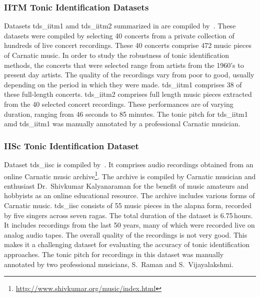 {\subsubsection{IITM Tonic Identification Datasets}
\label{sec:corpus_iitm_tonic_datasets}

Datasets \acrshort{tds_iitm1} amd \acrshort{tds_iitm2} summarized in  are compiled by~\cite{bellur2012knowledge}. These datasets were compiled by selecting 40 concerts from a private collection of hundreds of live concert recordings. These 40 concerts comprise 472 music pieces of Carnatic music. In order to study the robustness of tonic identification methods, the concerts that were selected range from artists from the 1960's to present day artists. The quality of the recordings vary from poor to good, usually depending on the period in which they were made. \acrshort{tds_iitm1} comprises 38 of these full-length concerts. \acrshort{tds_iitm2} comprises full length music pieces extracted from the 40 selected concert recordings. These performances are of varying duration, ranging from 46 seconds to 85 minutes. The tonic pitch for \acrshort{tds_iitm1} amd \acrshort{tds_iitm1} was manually annotated by a professional Carnatic musician.


\subsubsection{IISc Tonic Identification Dataset}
\label{sec:corpus_iisc_tonic_dataset}

Dataset \acrshort{tds_iisc} is compiled by~\cite{ranjani2011carnatic}. It comprises audio recordings obtained from an online Carnatic music archive\footnote{\url{http://www.shivkumar.org/music/index.html}}. The archive is compiled by Carnatic musician and enthusiast Dr.~Shivkumar Kalyanaraman for the benefit of music amateurs and hobbyists as an online educational resource. The archive includes various forms of Carnatic music. \acrshort{tds_iisc} consists of 55 music pieces in the \gls{alapna} form, recorded by five singers across seven \glspl{raga}. The total duration of the dataset is 6.75\,hours. It includes recordings from the last 50 years, many of which were recorded live on analog audio tapes. The overall quality of the recordings is not very good. This makes it a challenging dataset for evaluating the accuracy of tonic identification approaches. The tonic pitch for recordings in this dataset was manually annotated by two professional musicians, S.~Raman and S.~Vijayalakshmi.


}
